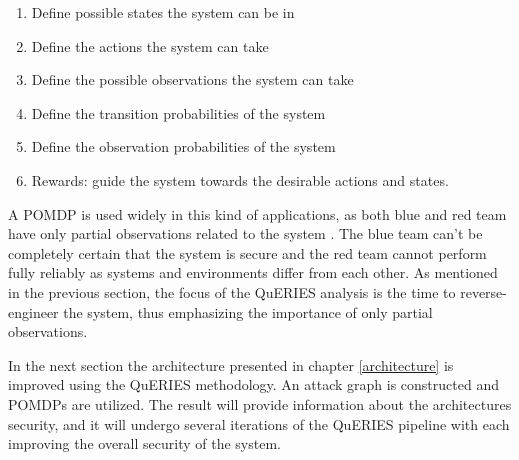\begin{enumerate}
    \item Define possible states the system can be in
    \item Define the actions the system can take
    \item Define the possible observations the system can take
    \item Define the transition probabilities of the system
    \item Define the observation probabilities of the system
    \item Rewards: guide the system towards the desirable actions and
      states.
\end{enumerate} \cite{hughes2013quantitative}

A POMDP is used widely in this kind of applications, as both blue and
red team have only partial observations related to the system
\cite{mcabeeMarkov}. The blue team can't be completely certain that
the system is secure and the red team cannot perform fully reliably as
systems and environments differ from each other. As mentioned in the
previous section, the focus of the QuERIES analysis is the time to
reverse-engineer the system, thus emphasizing the importance of only
partial observations.

In the next section the architecture presented in chapter
\ref{architecture} is improved using the QuERIES methodology. An
attack graph is constructed and POMDPs are utilized. The result will
provide information about the architectures security, and it will
undergo several iterations of the QuERIES pipeline with each improving
the overall security of the system. 
